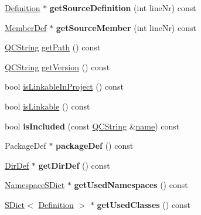 \begin{DoxyCompactItemize}
\item 
\hypertarget{class_file_def_aee482dd3e4a5968849e75f6ac02954e6}{\hyperlink{class_definition}{Definition} $\ast$ {\bfseries get\-Source\-Definition} (int line\-Nr) const }\label{class_file_def_aee482dd3e4a5968849e75f6ac02954e6}

\item 
\hypertarget{class_file_def_a15022659dd6ce876a1402a6503b33e2d}{\hyperlink{class_member_def}{Member\-Def} $\ast$ {\bfseries get\-Source\-Member} (int line\-Nr) const }\label{class_file_def_a15022659dd6ce876a1402a6503b33e2d}

\item 
\hyperlink{class_q_c_string}{Q\-C\-String} \hyperlink{class_file_def_a69eb2ae36c9531c5900b4ebe1e128af1}{get\-Path} () const 
\item 
\hyperlink{class_q_c_string}{Q\-C\-String} \hyperlink{class_file_def_a8e74a61bce5ac00e2350935c122bed89}{get\-Version} () const 
\item 
bool \hyperlink{class_file_def_a7ff00a84da6e47f3c64c6bf9f6316385}{is\-Linkable\-In\-Project} () const 
\item 
bool \hyperlink{class_file_def_afb5645c0dc69c2f1da67da6e33316e3b}{is\-Linkable} () const 
\item 
\hypertarget{class_file_def_a72295b17b1c80f5ab100af953409c373}{bool {\bfseries is\-Included} (const \hyperlink{class_q_c_string}{Q\-C\-String} \&\hyperlink{class_file_def_af92302878527ec555ba9e3fe066925ff}{name}) const }\label{class_file_def_a72295b17b1c80f5ab100af953409c373}

\item 
\hypertarget{class_file_def_a7a0fb0d63d3bbd17f6e51f25d657fdfe}{Package\-Def $\ast$ {\bfseries package\-Def} () const }\label{class_file_def_a7a0fb0d63d3bbd17f6e51f25d657fdfe}

\item 
\hypertarget{class_file_def_ac192aa4dfe8a77916af6236dfd50f4f2}{\hyperlink{class_dir_def}{Dir\-Def} $\ast$ {\bfseries get\-Dir\-Def} () const }\label{class_file_def_ac192aa4dfe8a77916af6236dfd50f4f2}

\item 
\hypertarget{class_file_def_a0ba0265415127e99dc450025df698d6c}{\hyperlink{class_namespace_s_dict}{Namespace\-S\-Dict} $\ast$ {\bfseries get\-Used\-Namespaces} () const }\label{class_file_def_a0ba0265415127e99dc450025df698d6c}

\item 
\hypertarget{class_file_def_aa1d1137c64e631b590cbe235e2962144}{\hyperlink{class_s_dict}{S\-Dict}$<$ \hyperlink{class_definition}{Definition} $>$ $\ast$ {\bfseries get\-Used\-Classes} () const }\label{class_file_def_aa1d1137c64e631b590cbe235e2962144}


\end{DoxyCompactItemize}
